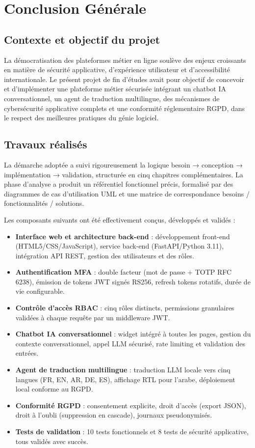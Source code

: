 \chapter*{Conclusion Générale}

\section*{Contexte et objectif du projet}
La démocratisation des plateformes métier en ligne soulève des enjeux croissants en matière de sécurité applicative, d'expérience utilisateur et d'accessibilité internationale. Le présent projet de fin d'études avait pour objectif de concevoir et d'implémenter une plateforme métier sécurisée intégrant un chatbot IA conversationnel, un agent de traduction multilingue, des mécanismes de cybersécurité applicative complets et une conformité réglementaire RGPD, dans le respect des meilleures pratiques du génie logiciel.

\section*{Travaux réalisés}
La démarche adoptée a suivi rigoureusement la logique besoin → conception → implémentation → validation, structurée en cinq chapitres complémentaires. La phase d'analyse a produit un référentiel fonctionnel précis, formalisé par des diagrammes de cas d'utilisation UML et une matrice de correspondance besoins / fonctionnalités / solutions.

Les composants suivants ont été effectivement conçus, développés et validés :
\begin{itemize}
    \item \textbf{Interface web et architecture back-end} : développement front-end (HTML5/CSS/JavaScript), service back-end (FastAPI/Python 3.11), intégration API REST, gestion des utilisateurs et des rôles.
    \item \textbf{Authentification MFA} : double facteur (mot de passe + TOTP RFC 6238), émission de tokens JWT signés RS256, refresh tokens rotatifs, durée de vie configurable.
    \item \textbf{Contrôle d'accès RBAC} : cinq rôles distincts, permissions granulaires validées à chaque requête par un middleware JWT.
    \item \textbf{Chatbot IA conversationnel} : widget intégré à toutes les pages, gestion du contexte conversationnel, appel LLM sécurisé, rate limiting et validation des entrées.
    \item \textbf{Agent de traduction multilingue} : traduction LLM locale vers cinq langues (FR, EN, AR, DE, ES), affichage RTL pour l'arabe, déploiement local conforme au RGPD.
    \item \textbf{Conformité RGPD} : consentement explicite, droit d'accès (export JSON), droit à l'oubli (suppression en cascade), journaux pseudonymisés.
    \item \textbf{Tests de validation} : 10 tests fonctionnels et 8 tests de sécurité applicative, tous validés avec succès.
\end{itemize}

